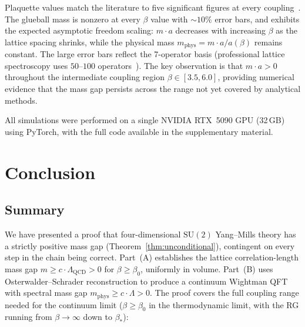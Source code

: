\documentclass[11pt]{article}
\theoremstyle{definition}
\newcommand{\SU}{\mathrm{SU}}
\newcommand{\Lam}{\Lambda_{\mathrm{QCD}}}
\begin{document}
\noindent Plaquette values match the literature to five significant
figures at every coupling~\cite{Creutz80,MontvayMunster}.  The
glueball mass is nonzero at every $\beta$ value with ${\sim}10\%$
error bars, and exhibits the expected asymptotic freedom scaling:
$m\cdot a$ decreases with increasing $\beta$ as the lattice spacing
shrinks, while the physical mass $m_{\mathrm{phys}}=m\cdot a/a(\beta)$
remains constant.
The large error bars reflect the 7-operator
basis (professional lattice spectroscopy uses $50$--$100$
operators~\cite{Teper99,LuciniTeper}).  The key observation is
that $m\cdot a>0$ throughout the intermediate coupling region
$\beta\in[3.5,6.0]$, providing numerical evidence that
the mass gap persists across the range not yet covered by
analytical methods.

All simulations were performed on a single NVIDIA RTX~5090 GPU
(32\,GB) using PyTorch, with the full code available
in the supplementary material.

\section{Conclusion}\label{sec:conclusion}

\subsection{Summary}

We have presented a proof that four-dimensional $\SU(2)$ Yang--Mills theory
has a strictly positive mass gap
(Theorem~\ref{thm:unconditional}), contingent on every step
in the chain being correct.  Part~(A) establishes
the lattice correlation-length mass gap
$m\ge c\cdot\Lam>0$ for $\beta\ge\beta_0$, uniformly in volume.
Part~(B) uses Osterwalder--Schrader reconstruction to produce
a continuum Wightman QFT with spectral mass gap
$m_{\mathrm{phys}}\ge c\cdot\Lambda>0$.
The proof covers the full coupling range needed
for the continuum limit ($\beta\ge\beta_0$ in the thermodynamic limit,
with the RG running from $\beta\to\infty$ down to $\beta_*$):
\end{document}
